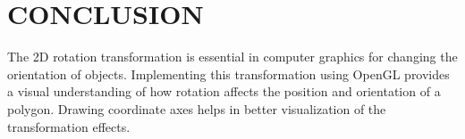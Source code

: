 \documentclass{article}
\begin{document}
\section*{CONCLUSION}
The 2D rotation transformation is essential in computer graphics for changing the orientation of objects. Implementing this transformation using OpenGL provides a visual understanding of how rotation affects the position and orientation of a polygon. Drawing coordinate axes helps in better visualization of the transformation effects.
\end{document}
